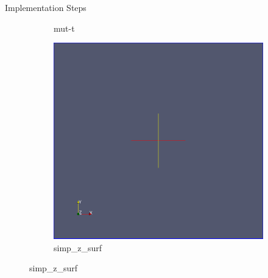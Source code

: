 \documentclass{beamer}
\begin{document}
\begin{frame} {Implementation Steps}
\begin{figure}[h]
\begin{subfigure}[b]{0.23\textwidth}
      \caption[5]{mut-t}
    \end{subfigure}
    \begin{subfigure}[b]{0.23\textwidth}
      \includegraphics[width=\textwidth]{simp_zero_surface}
      \caption[6]{simp\_z\_surf}
    \end{subfigure}
  \end{figure}
\end{frame}
\end{document}
